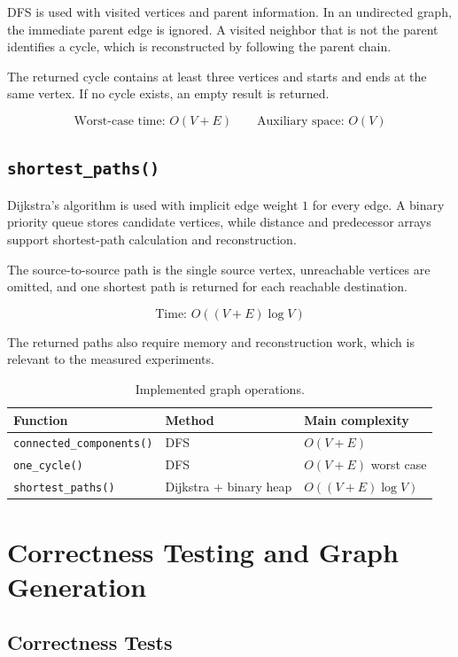 \documentclass[11pt]{article}
\newcommand{\code}[1]{\texttt{#1}}
\begin{document}
DFS is used with visited vertices and parent information. In an undirected graph, the immediate parent edge is ignored. 
A visited neighbor that is not the parent identifies a cycle, which is reconstructed by following the parent chain.

The returned cycle contains at least three vertices and starts and ends at the
same vertex. If no cycle exists, an empty result is returned.

\[
\text{Worst-case time: }O(V+E)
\qquad
\text{Auxiliary space: }O(V)
\]

\subsection{\code{shortest\_paths()}}

Dijkstra's algorithm is used with implicit edge weight $1$ for every edge. A binary priority queue stores candidate
vertices, while distance and predecessor arrays support shortest-path
calculation and reconstruction.

The source-to-source path is the single source vertex, unreachable vertices
are omitted, and one shortest path is returned for each reachable destination.

\[
\text{Time: }O((V+E)\log V)
\]

The returned paths also require memory and reconstruction work, which is
relevant to the measured experiments.

\begin{table}[ht]
\centering
\caption{Implemented graph operations.}
\begin{tabular}{lll}
\toprule
Function & Method & Main complexity\\
\midrule
\code{connected\_components()} & DFS & $O(V+E)$\\
\code{one\_cycle()} & DFS & $O(V+E)$ worst case\\
\code{shortest\_paths()} & Dijkstra + binary heap & $O((V+E)\log V)$\\
\bottomrule
\end{tabular}
\end{table}

\section{Correctness Testing and Graph Generation}

\subsection{Correctness Tests}
\end{document}
